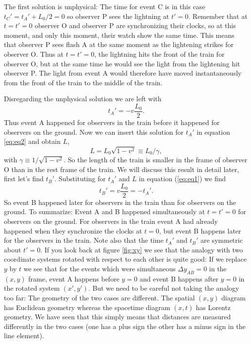 {\begin{multicols}{2}
The first solution is unphysical: The time for event C is in this case $t_C'=t_A'+L_0/2=0$ so observer P sees the lightning at $t'=0$. Remember that at $t=t'=0$ observer O and observer P are synchronizing their clocks, so at this moment, and only this moment, their watch show the same time. This means that observer P sees flash A at the same moment as the lightening strikes for observer O. Thus at $t=t'=0$, the lightning hits the front of the train for observer O, but at the same time he would see the light from the lightening hit observer P. The light from event A would therefore have moved instantaneously from the front of the train to the middle of the train.

Disregarding the unphysical solution we are left with
\[
t_A'=-v\frac{L_0}{2}.
\]
Thus event A happened for observers in the train before it happened for observers on the ground. Now we can insert this solution for $t_A'$ in equation \ref{eq:eq2} and obtain $L$,
\begin{equation}
\label{eq:deltal}
L=L_0\sqrt{1-v^2}\equiv L_0/\gamma,
\end{equation}
with $\gamma\equiv1/\sqrt{1-v^2}$. So the length of the train is smaller in the frame of observer O than in the rest frame of the train. We will discuss this result in detail later, first let's find $t_B'$. Substituting for $t_A'$ and $L$ in equation (\ref{eq:eq1}) we find
\[
t_B'=v\frac{L_0}{2}=-t_A'.
\]
So event B happened later for observers in the train than for observers on the ground. To summarize: Event A and B happened simultaneously at $t=t'=0$ for observers on the ground. For observers in the train event A had already happened when they synchronize the clocks at $t=0$, but event B happens later for the observers in the train. Note also that the time $t_A'$ and $t_B'$ are symmetric about $t'=0$. If you look back at figure \ref{fig:xy} we see that the analogy with two coordinate systems rotated with respect to each other is quite good: If we replace $y$ by $t$ we see that for the events which were simultaneous $\Delta y_{AB}=0$ in the $(x,y)$ frame, event A happens before $y=0$ and event B happens after $y=0$ in the rotated system $(x',y')$. But we need to be careful not taking the analogy too far: The geometry of the two cases are different. The spatial $(x,y)$ diagram has Euclidean geometry whereas the spacetime diagram $(x,t)$ has Lorentz geometry. We have seen that this simply means that distances are measured differently in the two cases (one has a plus sign the other has a minus sign in the line element).


\end{multicols}}
